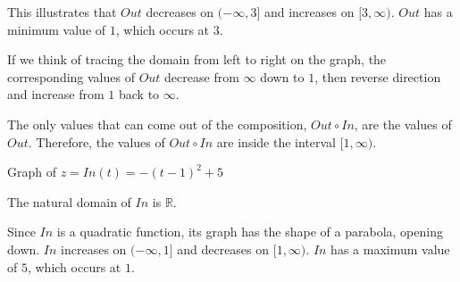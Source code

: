 \documentclass{ximera}
\begin{document}
This illustrates that $Out$ decreases on $(-\infty, 3]$ and increases on $[3, \infty)$.  $Out$ has a minimum value of $1$, which occurs at $3$. 

If we think of tracing the domain from left to right on the graph, the corresponding values of $Out$ decrease from $\infty$ down to $1$, then reverse direction and increase from $1$ back to $\infty$. 



The only values that can come out of the composition, $Out \circ In$, are the values of $Out$. Therefore, the values of $Out \circ In$ are inside the interval $[1, \infty)$.  



Graph of $z = In(t) = -(t-1)^2 + 5$





\begin{image}
\end{image}
The natural domain of $In$ is $\mathbb{R}$. 


Since $In$ is a quadratic function, its graph has the shape of a parabola, opening down.  $In$ increases on $(-\infty, 1]$ and decreases on $[1, \infty)$. $In$ has a maximum value of $5$, which occurs at $1$. 
\end{document}
